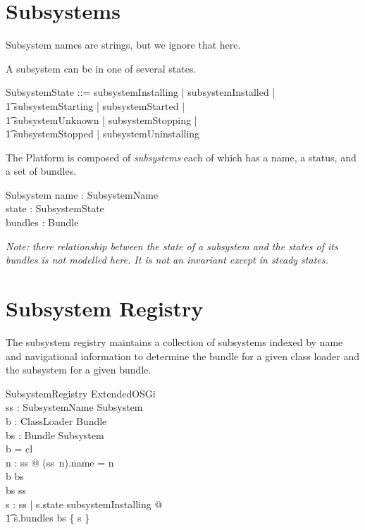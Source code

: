 \documentclass[a4paper]{article}
\begin{document}
\clearpage
\section{Subsystems}
\label{cha:subsystems}

Subsystem names are strings, but we ignore that here.
\begin{zed}
  [SubsystemName]
\end{zed}

A subsystem can be in one of several states.
\begin{zed}
  SubsystemState ::= subsystemInstalling | subsystemInstalled | \\
\t1 subsystemStarting | subsystemStarted | \\
\t1 subsystemUnknown | subsystemStopping | \\
\t1 subsystemStopped | subsystemUninstalling 
\end{zed}

The Platform is composed of \textit{subsystems} each of which has a name, a status, and a
set of bundles.
\begin{schema}{Subsystem}
name : SubsystemName \\
state : SubsystemState \\
bundles : \power Bundle \\
\end{schema}
\textit{Note: there relationship between the state of a subsystem and the states of
its bundles is not modelled here. It is not an invariant except in steady states.}

\clearpage
\section{Subsystem Registry}
\label{cha:subsystemRegistry}

The subsystem registry maintains a collection of subsystems indexed by name and navigational information
to determine the bundle for a given class loader and the subsystem for a given bundle.
\begin{schema}{SubsystemRegistry}
 ExtendedOSGi \\
 ss : SubsystemName \pinj Subsystem \\
 b : ClassLoader \pinj Bundle \\
 bs : Bundle \pfun Subsystem \\
\where
 b = cl\inv \\
 \forall n : \dom ss @ (ss~n).name = n \\
 \ran b \subseteq \dom bs \\
 \ran bs \subseteq \ran ss \\
 \forall s : \ran ss | s.state \neq subsystemInstalling @ \\
\t1 s.bundles \subseteq bs \inv \limg \{ s \} \rimg \\ 
\end{schema}
\end{document}
